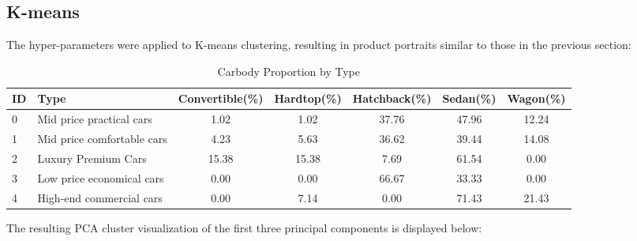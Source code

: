 \documentclass{article}
\begin{document}
\subsection{K-means}
The hyper-parameters were applied to K-means clustering, resulting in product portraits similar to those in the previous section:
\begin{table}[H]
    \small
    \caption{Carbody Proportion by Type}
    \begin{tabular}{llccccc}
        \toprule
        \textbf{ID} & \textbf{Type}              & \textbf{Convertible(\%)} & \textbf{Hardtop(\%)} & \textbf{Hatchback(\%)} & \textbf{Sedan(\%)} & \textbf{Wagon(\%)} \\
        \midrule
        0           & Mid price practical cars   & 1.02                     & 1.02                 & 37.76                  & 47.96              & 12.24              \\
        1           & Mid price comfortable cars & 4.23                     & 5.63                 & 36.62                  & 39.44              & 14.08              \\
        2           & Luxury Premium Cars        & 15.38                    & 15.38                & 7.69                   & 61.54              & 0.00               \\
        3           & Low price economical cars  & 0.00                     & 0.00                 & 66.67                  & 33.33              & 0.00               \\
        4           & High-end commercial cars   & 0.00                     & 7.14                 & 0.00                   & 71.43              & 21.43              \\
        \bottomrule
    \end{tabular}
\end{table}



The resulting PCA cluster visualization of the first three principal components is displayed below:
\end{document}
